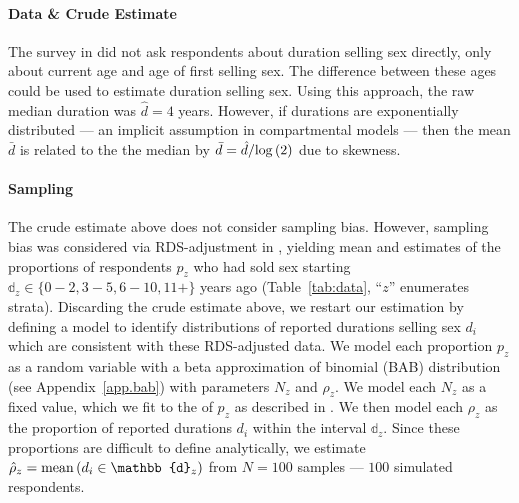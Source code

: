 \paragraph{Data \& Crude Estimate}
The survey in \cite{Baral2014} did not ask respondents about duration selling sex directly,
only about current age and age of first selling sex.
The difference between these ages could be used to estimate duration selling sex.
Using this approach, the raw median duration was $\hat{d} = 4$ years.
However, if durations are exponentially distributed
--- an implicit assumption in compartmental models \cite{Anderson1991} ---
then the mean $\bar{d}$ is related to the the median by
$\bar{d} = \hat{d}/\mathrm{log}\,(2)$ due to skewness.
\paragraph{Sampling}
The crude estimate above does not consider sampling bias.
However, sampling bias was considered via RDS-adjustment in \cite{Baral2014},
yielding mean and \ci estimates of the proportions of respondents $p_z$
who had sold sex starting $\mathbb{d}_z \in \{0{-}2, 3{-}5, 6{-}10, 11+\}$ years ago
(Table~\ref{tab:data}, ``$z$'' enumerates strata).
Discarding the crude estimate above,
we restart our estimation by defining a model to identify
distributions of reported durations selling sex $d_i$
which are consistent with these RDS-adjusted data.
We model each proportion $p_z$ as a random variable with
a beta approximation of binomial (BAB) distribution (see Appendix~\ref{app.bab})
with parameters $N_z$ and $\rho_z$.
We model each $N_z$ as a fixed value,
which we fit to the \ci of $p_z$ as described in .
We then model each $\rho_z$ as
the proportion of reported durations $d_i$ within the interval $\mathbb{d}_z$.
Since these proportions are difficult to define analytically,
we estimate $\hat{\rho}_z = \distr{mean}{d_i \in \mathbb{d}_z}$
from $N = 100$ samples --- \ie $100$ simulated respondents.
